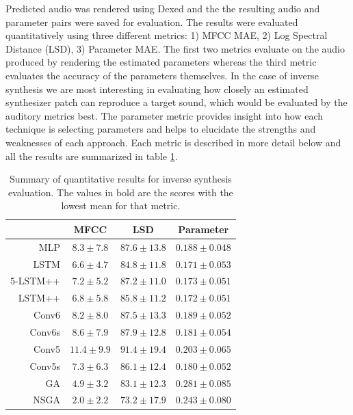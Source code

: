 Predicted audio was rendered using Dexed and the the resulting audio and parameter pairs were saved for evaluation. The results were evaluated quantitatively using three different metrics: 1) MFCC MAE,  2) Log Spectral Distance (LSD), 3) Parameter MAE. The first two metrics evaluate on the audio produced by rendering the estimated parameters whereas the third metric evaluates the accuracy of the parameters themselves. In the case of inverse synthesis we are most interesting in evaluating how closely an estimated synthesizer patch can reproduce a target sound, which would be evaluated by the auditory metrics best. The parameter metric provides insight into how each technique is selecting parameters and helps to elucidate the strengths and weaknesses of each approach. Each metric is described in more detail below and all the results are summarized in table \ref{tbl:objective_resuls}.

\begin{table}[ht]
\centering
\begin{tabular}{r|ccc}
\toprule
{} & MFCC & LSD & Parameter \\
\midrule
MLP      &       $8.3 \pm 7.8$ &     $87.6 \pm 13.8$ &  $0.188 \pm 0.048$ \\
\midrule
LSTM     &       $6.6 \pm 4.7$ &     $84.8 \pm 11.8$ &  $\mathbf{0.171 \pm 0.053}$ \\
5-LSTM++ &       $7.2 \pm 5.2$ &     $87.2 \pm 11.0$ &  $0.173 \pm 0.051$ \\
LSTM++   &       $6.8 \pm 5.8$ &     $85.8 \pm 11.2$ &  $0.172 \pm 0.051$ \\
\midrule
Conv6    &       $8.2 \pm 8.0$ &     $87.5 \pm 13.3$ &  $0.189 \pm 0.052$ \\
Conv6s   &       $8.6 \pm 7.9$ &     $87.9 \pm 12.8$ &  $0.181 \pm 0.054$ \\
Conv5    &      $11.4 \pm 9.9$ &     $91.4 \pm 19.4$ &  $0.203 \pm 0.065$ \\
Conv5s   &       $7.3 \pm 6.3$ &     $86.1 \pm 12.4$ &  $0.180 \pm 0.052$ \\
\midrule
GA       &       $4.9 \pm 3.2$ &     $83.1 \pm 12.3$ &  $0.281 \pm 0.085$ \\
NSGA     &       $\mathbf{2.0 \pm 2.2}$ &     $\mathbf{73.2 \pm 17.9}$ &  $0.243 \pm 0.080$ \\
\bottomrule
\end{tabular}
\caption{Summary of quantitative results for inverse synthesis evaluation. The values in bold are the scores with the lowest mean for that metric.}
\label{tbl:objective_resuls}
\end{table}

